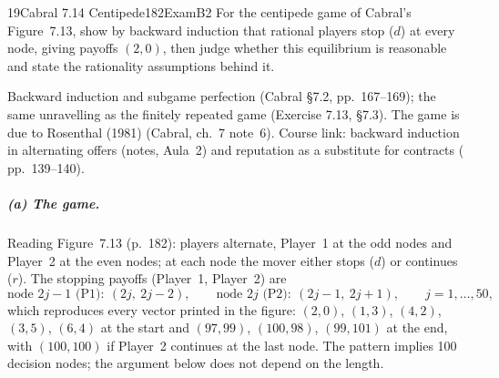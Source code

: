 \begin{exsol}{19}{Cabral 7.14 Centipede}{182}{Exam}{B2}
\asked For the centipede game of Cabral's Figure~7.13, show by backward induction that rational
players stop ($d$) at every node, giving payoffs $(2,0)$, then judge whether this equilibrium is
reasonable and state the rationality assumptions behind it.

\method Backward induction and subgame perfection (Cabral \S7.2, pp.~167--169); the same
unravelling as the finitely repeated game (Exercise 7.13, \S7.3). The game is due to Rosenthal
(1981) (Cabral, ch.~7 note~6). Course link: backward induction in alternating offers (notes,
Aula~2) and reputation as a substitute for contracts (\MR{} pp.~139--140).

\solution
\subparagraph{(a) The game.} Reading Figure~7.13 (p.~182): players alternate, Player~1 at the odd
nodes and Player~2 at the even nodes; at each node the mover either stops ($d$) or continues
($r$). The stopping payoffs (Player~1, Player~2) are
\[
\text{node } 2j-1 \text{ (P1)}:\ (2j,\ 2j-2), \qquad
\text{node } 2j \text{ (P2)}:\ (2j-1,\ 2j+1), \qquad j = 1,\dots,50,
\]
which reproduces every vector printed in the figure: $(2,0)$, $(1,3)$, $(4,2)$, $(3,5)$,
$(6,4)$ at the start and $(97,99)$, $(100,98)$, $(99,101)$ at the end, with $(100,100)$ if
Player~2 continues at the last node. The pattern implies 100 decision nodes; the argument below
does not depend on the length.
\begin{center}
\end{center}


\end{exsol}

